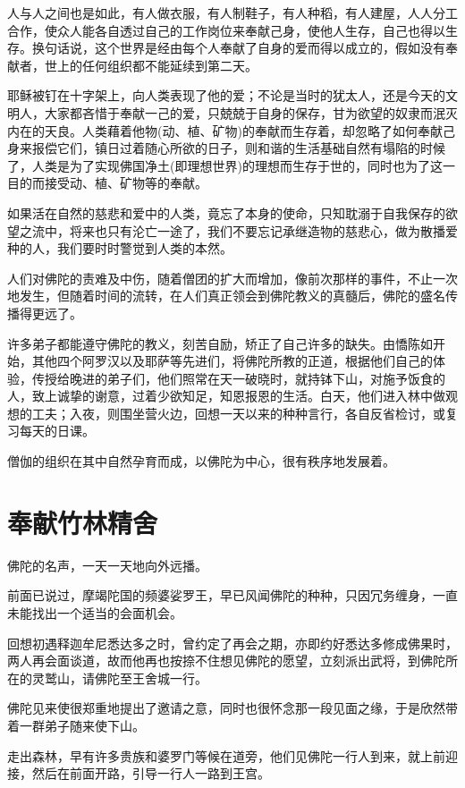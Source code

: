 \documentclass[12pt,twoside,openany]{book}
\begin{document}
人与人之间也是如此，有人做衣服，有人制鞋子，有人种稻，有人建屋，人人分工合作，使众人能各自透过自己的工作岗位来奉献己身，使他人生存，自己也得以生存。换句话说，这个世界是经由每个人奉献了自身的爱而得以成立的，假如没有奉献者，世上的任何组织都不能延续到第二天。

耶稣被钉在十字架上，向人类表现了他的爱；不论是当时的犹太人，还是今天的文明人，大家都吝惜于奉献一己的爱，只兢兢于自身的保存，甘为欲望的奴隶而泯灭内在的天良。人类藉着他物(动、植、矿物)的奉献而生存着，却忽略了如何奉献己身来报偿它们，镇日过着随心所欲的日子，则和谐的生活基础自然有塌陷的时候了，人类是为了实现佛国净土(即理想世界)的理想而生存于世的，同时也为了这一目的而接受动、植、矿物等的奉献。

如果活在自然的慈悲和爱中的人类，竟忘了本身的使命，只知耽溺于自我保存的欲望之流中，将来也只有沦亡一途了，我们不要忘记承继造物的慈悲心，做为散播爱种的人，我们要时时警觉到人类的本然。

人们对佛陀的责难及中伤，随着僧团的扩大而增加，像前次那样的事件，不止一次地发生，但随着时间的流转，在人们真正领会到佛陀教义的真髓后，佛陀的盛名传播得更远了。

许多弟子都能遵守佛陀的教义，刻苦自励，矫正了自己许多的缺失。由憍陈如开始，其他四个阿罗汉以及耶萨等先进们，将佛陀所教的正道，根据他们自己的体验，传授给晚进的弟子们，他们照常在天一破晓时，就持钵下山，对施予饭食的人，致上诚挚的谢意，过着少欲知足，知恩报恩的生活。白天，他们进入林中做观想的工夫；入夜，则围坐营火边，回想一天以来的种种言行，各自反省检讨，或复习每天的日课。

僧伽的组织在其中自然孕育而成，以佛陀为中心，很有秩序地发展着。

\section{奉献竹林精舍}\label{sec3.11}

佛陀的名声，一天一天地向外远播。

前面已说过，摩竭陀国的频婆娑罗王，早已风闻佛陀的种种，只因冗务缠身，一直未能找出一个适当的会面机会。

回想初遇释迦牟尼悉达多之时，曾约定了再会之期，亦即约好悉达多修成佛果时，两人再会面谈道，故而他再也按捺不住想见佛陀的愿望，立刻派出武将，到佛陀所在的灵鹫山，请佛陀至王舍城一行。

佛陀见来使很郑重地提出了邀请之意，同时也很怀念那一段见面之缘，于是欣然带着一群弟子随来使下山。

走出森林，早有许多贵族和婆罗门等候在道旁，他们见佛陀一行人到来，就上前迎接，然后在前面开路，引导一行人一路到王宫。
\end{document}
